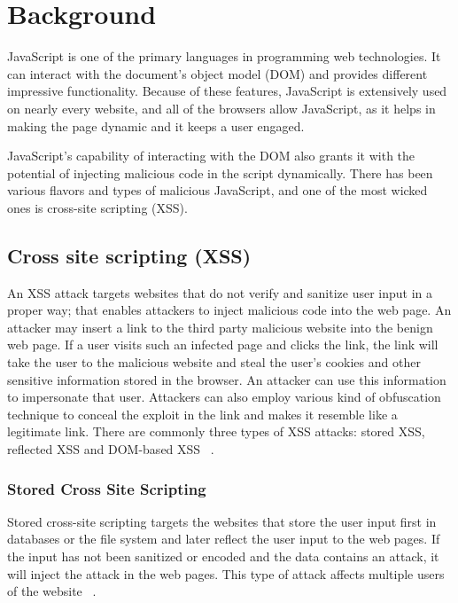 \chapter{Background\label{background}}

JavaScript is one of the primary languages in programming web technologies. It can interact with the document's object model (DOM) and provides different impressive functionality. Because of these features, JavaScript is extensively used on nearly every website, and all of the browsers allow JavaScript, as it helps in making the page dynamic and it keeps a user engaged. 

JavaScript's capability of interacting with the DOM also grants it with the potential of injecting malicious code in the script dynamically. There has been various flavors and types of malicious JavaScript, and one of the most wicked ones is cross-site scripting (XSS).

\section{Cross site scripting (XSS)}

An XSS attack targets websites that do not verify and sanitize user input in a proper way; that enables attackers to inject malicious code into the web page. An attacker may insert a link to the third party malicious website into the benign web page. If a user visits such an infected page and clicks the link, the link will take the user to the malicious website and steal the user's cookies and other sensitive information stored in the browser. An attacker can use this information to impersonate that user. Attackers can also employ various kind of obfuscation technique to conceal the exploit in the link and makes it resemble like a legitimate link. There are commonly three types of XSS attacks: stored XSS, reflected XSS and DOM-based XSS ~\cite{g12}. 

\subsection{Stored Cross Site Scripting}

Stored cross-site scripting targets the websites that store the user input first in databases or the file system and later reflect the user input to the web pages. If the input has not been sanitized or encoded and the data contains an attack, it will inject the attack in the web pages. This type of attack affects multiple users of the website ~\cite{g12}.

